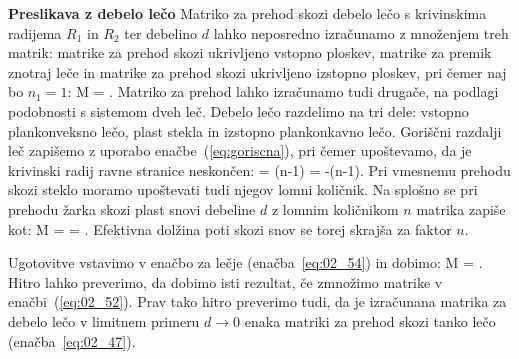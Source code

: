 \begin{example}{\bf Preslikava z debelo lečo}
Matriko za prehod skozi debelo lečo s krivinskima radijema
$R_1$ in $R_2$ ter debelino $d$ lahko neposredno izračunamo
z množenjem treh matrik: matrike za prehod skozi ukrivljeno vstopno 
ploskev, matrike za premik znotraj leče in matrike za prehod skozi 
ukrivljeno izstopno ploskev, pri čemer naj bo $n_1 = 1$:
\beq
M = 
\cdot
\left[\begin{array}{cc}
1& d\\
0&1
\end{array}\right]
\cdot
{}\!\!.
\label{eq:02_52}
\eeq
Matriko za prehod lahko izračunamo tudi drugače, na podlagi podobnosti 
s sistemom dveh leč. Debelo lečo razdelimo
na tri dele: vstopno plankonveksno lečo, plast stekla in izstopno plankonkavno lečo.
Goriščni razdalji leč zapišemo z uporabo enačbe~(\ref{eq:goriscna}), pri čemer upoštevamo, 
da je krivinski radij ravne stranice neskončen:
\beq
{} = (n-1)\qquad {} \qquad {} = -(n-1).
\label{eq:02_53}
\eeq
Pri vmesnemu prehodu skozi steklo moramo upoštevati tudi njegov
lomni količnik. Na splošno se pri prehodu žarka skozi plast snovi debeline $d$
z lomnim količnikom $n$ matrika zapiše kot:
\beq
M = 
\left[\begin{array}{cc}
1& 0\\
0&n
\end{array}\right]\cdot
\left[\begin{array}{cc}
1& d\\
0&1
\end{array}\right]\cdot
{} = 
\!\!.
\label{eq:02_54a}
\eeq
Efektivna dolžina poti skozi snov se torej skrajša za faktor $n$.

Ugotovitve vstavimo v enačbo za lečje (enačba~\ref{eq:02_54}) in dobimo:
\beq
M = 
\!\!.
\label{eq:02_53a}
\eeq
Hitro lahko preverimo, da dobimo isti rezultat, če zmnožimo matrike v enačbi~(\ref{eq:02_52}).
Prav tako hitro preverimo tudi, da je izračunana matrika za debelo lečo v limitnem 
primeru $d \to 0$ enaka matriki za prehod skozi tanko lečo (enačba~\ref{eq:02_47}). 
\end{example}

